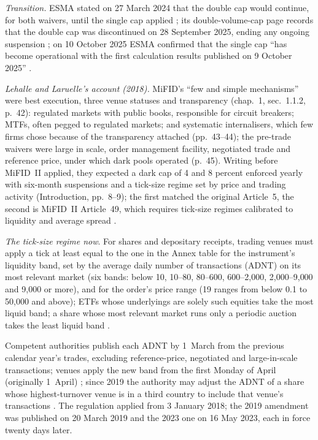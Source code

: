 \begin{qfrule}
\emph{Transition.} ESMA stated on 27 March 2024 that the double cap would continue, for both waivers, until the single cap applied \citep[p.~2]{esma-transition-statement-2024}; its double-volume-cap page records that the double cap was discontinued on 28 September 2025, ending any ongoing suspension \citep[web page]{esma-dvc-page}; on 10 October 2025 ESMA confirmed that the single cap ``has become operational with the first calculation results published on 9 October 2025'' \citep[p.~3]{esma-mifir-review-statement-2025}.

 \emph{Lehalle and Laruelle's account (2018).} MiFID's ``few and simple mechanisms'' were best execution, three venue statuses and transparency (chap.~1, sec.~1.1.2, p.~42): regulated markets with public books, responsible for circuit breakers; MTFs, often pegged to regulated markets; and systematic internalisers, which few firms chose because of the transparency attached (pp.~43--44); the pre-trade waivers were large in scale, order management facility, negotiated trade and reference price, under which dark pools operated (p.~45). Writing before MiFID~II applied, they expected a dark cap of 4 and 8 percent enforced yearly with six-month suspensions and a tick-size regime set by price and trading activity (Introduction, pp.~8--9); the first matched the original Article~5, the second is MiFID~II Article~49, which requires tick-size regimes calibrated to liquidity and average spread \citep[Art.~49]{eu-dir-2014-65}.

\emph{The tick-size regime now}. For shares and depositary receipts, trading venues must apply a tick at least equal to the one in the Annex table for the instrument's liquidity band, set by the average daily number of transactions (ADNT) on its most relevant market (six bands: below 10, 10--80, 80--600, 600--2{,}000, 2{,}000--9{,}000 and 9{,}000 or more), and for the order's price range (19 ranges from below 0.1 to 50{,}000 and above); ETFs whose underlyings are solely such equities take the most liquid band; a share whose most relevant market runs only a periodic auction takes the least liquid band \citep[Arts.~2--3 and Annex]{eu-rts11-2017-588}.

Competent authorities publish each ADNT by 1~March from the previous calendar year's trades, excluding reference-price, negotiated and large-in-scale transactions; venues apply the new band from the first Monday of April (originally 1~April) \citep[Art.~3(1), (2) and~(4)]{eu-rts11-2017-588} \citep[Art.~1]{eu-rts11-amend-2023-960}; since 2019 the authority may adjust the ADNT of a share whose highest-turnover venue is in a third country to include that venue's transactions \citep[Art.~1, new Art.~3(8)--(10)]{eu-rts11-amend-2019-443}. The regulation applied from 3 January 2018; the 2019 amendment was published on 20 March 2019 and the 2023 one on 16 May 2023, each in force twenty days later.


\end{qfrule}
